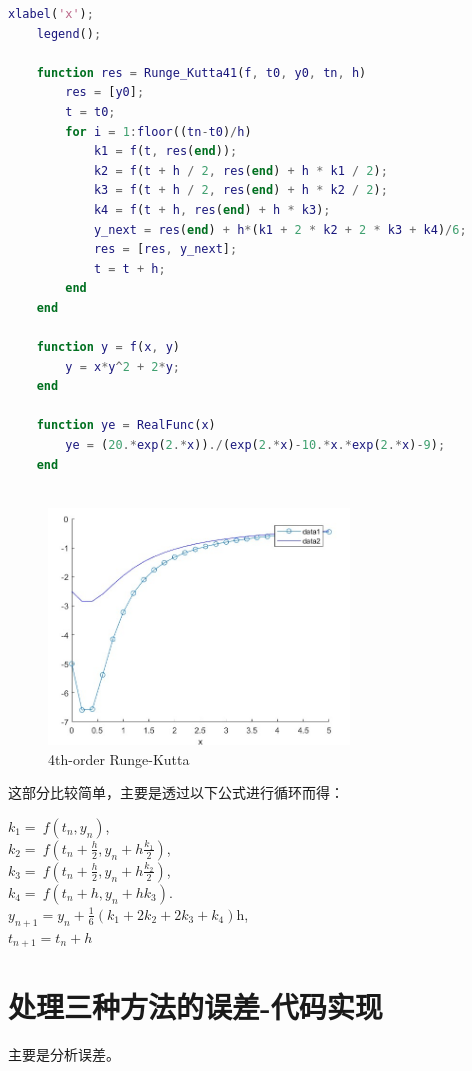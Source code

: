 \documentclass[12pt, a4paper, oneside]{ctexart}
\begin{document}
\begin{spacing}{2.0}
\begin{lstlisting}[language=MATLAB, caption=4th-order Runge-Kutta]
    xlabel('x');
    legend();
    
    function res = Runge_Kutta41(f, t0, y0, tn, h)
        res = [y0];
        t = t0;
        for i = 1:floor((tn-t0)/h)
            k1 = f(t, res(end));
            k2 = f(t + h / 2, res(end) + h * k1 / 2);
            k3 = f(t + h / 2, res(end) + h * k2 / 2);
            k4 = f(t + h, res(end) + h * k3);
            y_next = res(end) + h*(k1 + 2 * k2 + 2 * k3 + k4)/6;
            res = [res, y_next];
            t = t + h;
        end
    end
    
    function y = f(x, y)
        y = x*y^2 + 2*y;
    end
    
    function ye = RealFunc(x)
        ye = (20.*exp(2.*x))./(exp(2.*x)-10.*x.*exp(2.*x)-9);
    end
    
\end{lstlisting}
\begin{figure}[htbp][H]
    \centering
    \includegraphics[width=8cm]{Runge_Kutta411.jpg}
    \caption{4th-order Runge-Kutta}
\end{figure}

这部分比较简单，主要是透过以下公式进行循环而得：
\begin{center}
    
    $    k_1 = \ f(t_n, y_n)$, \\
    $k_2 = \ f\!\left(t_n + \frac{h}{2}, y_n + h\frac{k_1}{2}\right)$, \\ 
    $k_3 = \ f\!\left(t_n + \frac{h}{2}, y_n + h\frac{k_2}{2}\right)$, \\
    $k_4 = \ f\!\left(t_n + h, y_n + hk_3\right)$.\\
    $y_{n+1} = y_n + \frac{1}{6}\left(k_1 + 2k_2 + 2k_3 + k_4 \right)$h,\\
    $t_{n+1} = t_n + h$ \\


\end{center}
\section{处理三种方法的误差-代码实现}
主要是分析误差。

\end{spacing}
\end{document}

